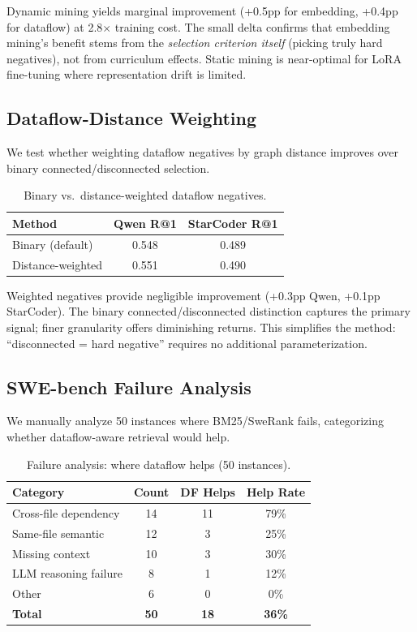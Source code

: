 \documentclass[11pt,a4paper]{article}
\begin{document}
Dynamic mining yields marginal improvement (+0.5pp for embedding, +0.4pp for dataflow) at 2.8$\times$ training cost. The small delta confirms that embedding mining's benefit stems from the \emph{selection criterion itself} (picking truly hard negatives), not from curriculum effects. Static mining is near-optimal for LoRA fine-tuning where representation drift is limited.

\subsection{Dataflow-Distance Weighting}

We test whether weighting dataflow negatives by graph distance improves over binary connected/disconnected selection.

\begin{table}[t]
\centering
\small
\caption{Binary vs.\ distance-weighted dataflow negatives.}
\label{tab:weighted}
\begin{tabular}{lcc}
\toprule
\textbf{Method} & \textbf{Qwen R@1} & \textbf{StarCoder R@1} \\
\midrule
Binary (default) & 0.548 & 0.489 \\
Distance-weighted & 0.551 & 0.490 \\
\bottomrule
\end{tabular}
\end{table}

Weighted negatives provide negligible improvement (+0.3pp Qwen, +0.1pp StarCoder). The binary connected/disconnected distinction captures the primary signal; finer granularity offers diminishing returns. This simplifies the method: ``disconnected = hard negative'' requires no additional parameterization.

\subsection{SWE-bench Failure Analysis}

We manually analyze 50 instances where BM25/SweRank fails, categorizing whether dataflow-aware retrieval would help.

\begin{table}[t]
\centering
\small
\caption{Failure analysis: where dataflow helps (50 instances).}
\label{tab:failure}
\begin{tabular}{lccc}
\toprule
\textbf{Category} & \textbf{Count} & \textbf{DF Helps} & \textbf{Help Rate} \\
\midrule
Cross-file dependency & 14 & 11 & 79\% \\
Same-file semantic & 12 & 3 & 25\% \\
Missing context & 10 & 3 & 30\% \\
LLM reasoning failure & 8 & 1 & 12\% \\
Other & 6 & 0 & 0\% \\
\midrule
\textbf{Total} & \textbf{50} & \textbf{18} & \textbf{36\%} \\
\bottomrule
\end{tabular}
\end{table}
\end{document}
